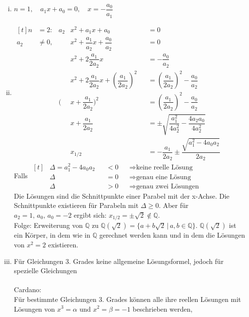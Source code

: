 \documentclass{article}
\theoremstyle{definition}
\theoremstyle{definition}
\begin{document}
\begin{enumerate}[(i)]
    \item $n=1,\quad a_{1}x+a_{0}=0,\quad x=-\dfrac{a_{0}}{a_{1}}$
    \item $\begin{aligned}[t]
        n&=2: & a_{2}&x^{2}+a_{1}x+a_{0} & &=0\\
        a_{2}&\neq 0, & &x^{2}+\dfrac{a_{1}}{a_{2}}x+\dfrac{a_{0}}{a_{2}} & &= 0\\
        & & &x^{2}+2\dfrac{a_{1}}{2a_{2}}x & &= - \dfrac{a_{0}}{a_{2}}\\
        & & &x^{2}+2\dfrac{a_{1}}{2a_{2}}x +(\dfrac{a_{1}}{2a_{2}})^2 & &= (\dfrac{a_{1}}{2a_{2}})^2 - \dfrac{a_{0}}{a_{2}}\\
        & & (&x+\dfrac{a_{1}}{2a_{2}})^2 & &= (\dfrac{a_{1}}{2a_{2}})^2 - \dfrac{a_{0}}{a_{2}}\\
        & & &x+\dfrac{a_{1}}{2a_{2}} & &=\pm\sqrt{\dfrac{a_{1}^{2}}{4a_{2}^{2}} - \dfrac{4a_{2}a_{0}}{4a_{2}^{2}}}\\
        & & &x_{1/2} & &=-\dfrac{a_{1}}{2a_{2}}\pm\dfrac{\sqrt{a_{1}^{2}-4a_{0}a_{2}}}{2a_{2}}
        \end{aligned}$\\
		Falls $\begin{aligned}[t]
            &\Delta = a_{1}^{2}-4a_{0}a_{2} & &< 0 & &\Rightarrow \text{keine reelle Lösung}\\
            &\Delta & &=0 & &\Rightarrow \text{genau eine Lösung}\\
            &\Delta & &> 0 & &\Rightarrow \text{genau zwei Lösungen}
        \end{aligned}$\\
        Die Lösungen sind die Schnittpunkte einer Parabel mit der x-Achse. Die Schnittpunkte existieren für Parabeln mit $\Delta \geq 0$.
        Aber für ${a_{2}=1,\,a_{0},\,a_{0}=-2}$ ergibt sich: $x_{1/2} = \pm \sqrt{2}\notin \mathbb{Q}$.\\
        Folge: Erweiterung von $\mathbb{Q}$ zu $\mathbb{Q}(\sqrt{2})=\{a + b\sqrt{2}\,|\,a,b\in\mathbb{Q}\}$.
        $\mathbb{Q}(\sqrt{2})$ ist ein Körper, in dem wie in $\mathbb{Q}$ gerechnet werden kann und in dem die Lösungen von $x^{2}=2$ existieren.
    \item Für Gleichungen 3. Grades keine allgemeine Lösungsformel, jedoch für spezielle Gleichungen\\\\
        Cardano: \\
        Für bestimmte Gleichungen 3. Grades können alle ihre reellen Lösungen mit Lösungen von $x^{3}=\alpha$ und $x^{2}=\beta=-1$ beschrieben werden,

\end{enumerate}
\end{document}
